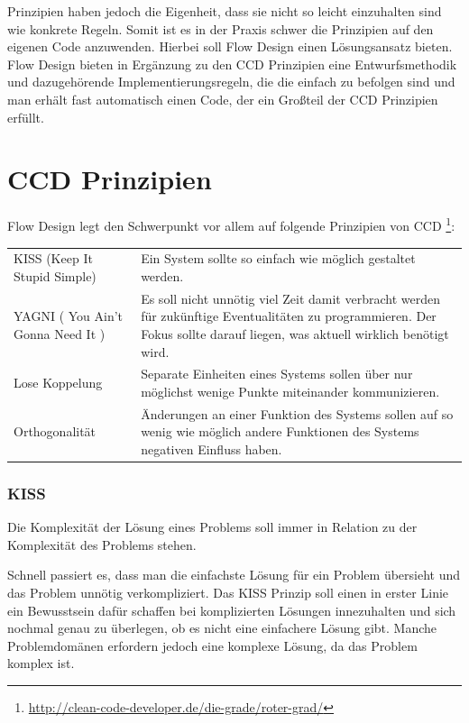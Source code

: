 Prinzipien haben jedoch die Eigenheit, dass sie nicht so leicht einzuhalten sind wie konkrete Regeln.
Somit ist es in der Praxis schwer die Prinzipien auf den eigenen Code anzuwenden.
Hierbei soll Flow Design einen Lösungsansatz bieten. Flow Design bieten in
Ergänzung zu den CCD Prinzipien eine Entwurfsmethodik und dazugehörende Implementierungsregeln, die
die einfach zu befolgen sind und man erhält fast automatisch einen Code, der ein Großteil der CCD Prinzipien erfüllt.

\section{CCD Prinzipien}

Flow Design legt den Schwerpunkt vor allem auf folgende Prinzipien von CCD \footnote{\url{http://clean-code-developer.de/die-grade/roter-grad/}}:

\bigskip

\begin{tabularx}{\textwidth}{p{160 pt}|X}
KISS (Keep It Stupid Simple) & Ein System sollte so einfach wie möglich gestaltet werden. \\
YAGNI ( You Ain't Gonna Need It ) & Es soll nicht unnötig viel Zeit damit verbracht werden für zukünftige Eventualitäten zu programmieren. 
Der Fokus sollte darauf liegen, was aktuell wirklich benötigt wird. \\
Lose Koppelung & Separate Einheiten eines Systems sollen über nur möglichst  wenige Punkte miteinander kommunizieren. \\
Orthogonalität & Änderungen an einer Funktion des Systems sollen auf so wenig wie möglich andere Funktionen des Systems negativen Einfluss haben. \\
\end{tabularx}

\subsubsection{KISS}

Die Komplexität der Lösung eines Problems soll immer in Relation zu der
Komplexität des Problems stehen.

Schnell passiert es, dass man die einfachste Lösung für ein Problem übersieht und das Problem unnötig verkompliziert.
Das KISS Prinzip soll einen in erster Linie ein Bewusstsein dafür schaffen bei
komplizierten Lösungen innezuhalten und sich nochmal genau zu
überlegen, ob es nicht eine einfachere Lösung gibt.
Manche Problemdomänen erfordern jedoch eine komplexe Lösung, da das Problem
komplex ist.

